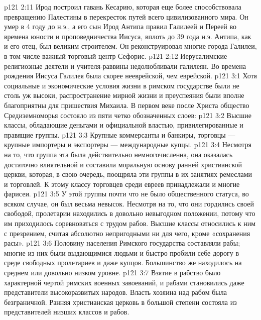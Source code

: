 \vs p121 2:11 Ирод построил гавань Кесарию, которая еще более способствовала превращению Палестины в перекресток путей всего цивилизованного мира. Он умер в 4 году до н.э., а его сын Ирод Антипа правил Галилеей и Переей во времена юности и проповедничества Иисуса, вплоть до 39 года н.э. Антипа, как и его отец, был великим строителем. Он реконструировал многие города Галилеи, в том числе важный торговый центр Сефорис.
\vs p121 2:12 Иерусалимские религиозные деятели и учителя\hyp{}раввины недолюбливали галилеян. Во времена рождения Иисуса Галилея была скорее нееврейской, чем еврейской.
\vs p121 3:1 Хотя социальные и экономические условия жизни в римском государстве были не столь уж высоки, распространение мирной жизни и преуспеяния были вполне благоприятны для пришествия Михаила. В первом веке после Христа общество Средиземноморья состояло из пяти четко обозначенных слоев:
\vs p121 3:2 \bibnobreakspace {} Высшие классы, обладающие деньгами и официальной властью, привилегированные и правящие группы.
\vs p121 3:3 \pc {}\bibnobreakspace {} Крупные коммерсанты и банкиры, торговцы --- крупные импортеры и экспортеры --- международные купцы.
\vs p121 3:4 \pc {}\bibnobreakspace {} Несмотря на то, что группа эта была действительно немногочисленна, она оказалась достаточно влиятельной и составила моральную основу ранней христианской церкви, которая, в свою очередь, поощряла эти группы в их занятиях ремеслами и торговлей. К этому классу торговцев среди евреев принадлежали и многие фарисеи.
\vs p121 3:5 \pc {}\bibnobreakspace {} У этой группы почти что не было общественного статуса, во всяком случае, он был весьма невысок. Несмотря на то, что они гордились своей свободой, пролетарии находились в довольно невыгодном положении, потому что им приходилось соревноваться с трудом рабов. Высшие классы относились к ним с презрением, считая абсолютно непригодными ни для чего, кроме «сохранения расы».
\vs p121 3:6 \pc {}\bibnobreakspace {} Половину населения Римского государства составляли рабы; многие из них были выдающимися людьми и быстро пробили себе дорогу в среде свободных пролетариев и даже купцов. Большинство же находилось на среднем или довольно низком уровне.
\vs p121 3:7 Взятие в рабство было характерной чертой римских военных завоеваний, и рабами становились даже представители высокоразвитых народов. Власть хозяина над рабом была безграничной. Ранняя христианская церковь в большой степени состояла из представителей низших классов и рабов.
